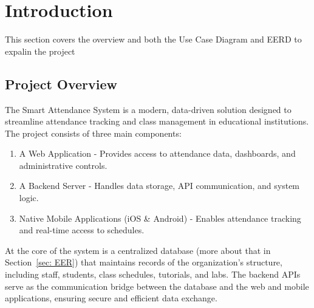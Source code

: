 \documentclass[a4paper, 12pt]{article}
\begin{document}
  \pagebreak
  \tableofcontents
  \pagebreak

  \section{Introduction}
    This section covers the overview and both the Use Case Diagram and EERD to expalin the project

    \subsection{Project Overview}
      The Smart Attendance System is a modern, data-driven solution designed to streamline attendance tracking and class management in educational institutions. The project consists of three main components:
      \begin{enumerate}
        \item A Web Application - Provides access to attendance data, dashboards, and administrative controls.
        \item A Backend Server - Handles data storage, API communication, and system logic.
        \item Native Mobile Applications (iOS \& Android) - Enables attendance tracking and real-time access to schedules.
      \end{enumerate}
    
      \noindent At the core of the system is a centralized database (more about that in Section~\ref{sec: EER}) that maintains records of the organization's structure, including staff, students, class schedules, tutorials, and labs.
      The backend APIs serve as the communication bridge between the database and the web and mobile applications, ensuring secure and efficient data exchange. \\
\end{document}

